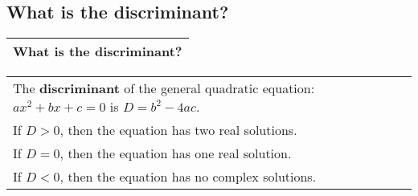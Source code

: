 \subsection{What is the discriminant?}
\begin{small}
    \begin{tabularx}{1\textwidth}{
            p{}
        }
        \toprule
            What is the discriminant?
        \\
        \bottomrule
    \end{tabularx}
\end{small}
\begin{small}
    \begin{tabularx}{1\textwidth}{
            p{}
        }
        \toprule
        The \textbf{discriminant} of the general quadratic equation: $ax^2 + bx
        + c = 0$ is $D = b^2 - 4ac$. \\
        If $D>0$, then the equation has two real solutions. \\
        If $D=0$, then the equation has one real solution. \\
        If $D<0$, then the equation has no complex solutions.
        \\
        \bottomrule
    \end{tabularx}
\end{small}
